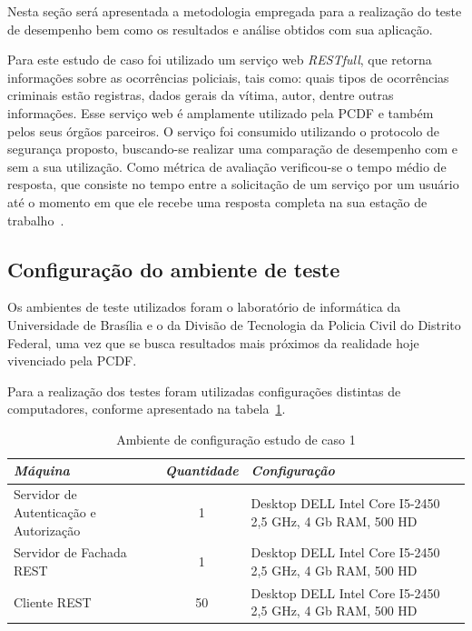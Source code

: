 Nesta seção será apresentada a metodologia empregada para a realização do teste de desempenho bem como os resultados e análise obtidos com sua aplicação.

Para este estudo de caso foi utilizado um serviço web \emph{RESTfull}, que retorna informações sobre as ocorrências policiais, tais como: quais tipos de ocorrências criminais estão registras, dados gerais da vítima, autor, dentre outras informações. Esse serviço web é amplamente utilizado pela PCDF e também pelos seus órgãos parceiros. O serviço foi consumido utilizando o protocolo de segurança proposto, buscando-se realizar uma comparação de desempenho com e sem a sua utilização. Como métrica de avaliação verificou-se o tempo médio de resposta, que consiste no tempo entre a solicitação de um serviço por um usuário até o momento em que ele recebe uma resposta completa na sua estação de trabalho~\cite{ Molyneaux2009}.

\subsection{Configuração do ambiente de teste}

Os ambientes de teste utilizados foram o laboratório de informática da Universidade de Brasília e o da Divisão de Tecnologia da Policia Civil do Distrito Federal, uma vez que se busca resultados mais próximos da realidade hoje vivenciado pela PCDF.

Para a realização dos testes foram utilizadas configurações distintas de computadores, conforme apresentado na tabela~\ref{tb:estudo_caso1}.
%
\begin{table}[h]
    \begin{tabular}{|l|c|p{6cm}|}
    \hline
    \textbf{\emph{Máquina }}                   & \textbf{\emph{Quantidade}} & \textbf{\emph{Configuração}}                                                                               \\ \hline
    Servidor de Autenticação e Autorização  & 1          & Desktop DELL Intel Core I5-2450 2,5 GHz, 4 Gb RAM, 500 HD \\ \hline
    Servidor de Fachada REST  & 1          & Desktop DELL Intel Core I5-2450 2,5 GHz, 4 Gb RAM, 500 HD\\ \hline
    Cliente REST                   & 50        & Desktop DELL Intel Core I5-2450 2,5 GHz, 4 Gb RAM, 500 HD                                    \\ \hline
    \end{tabular}
    \caption {Ambiente de configuração estudo de caso 1}\label{tb:estudo_caso1}
\end{table}

